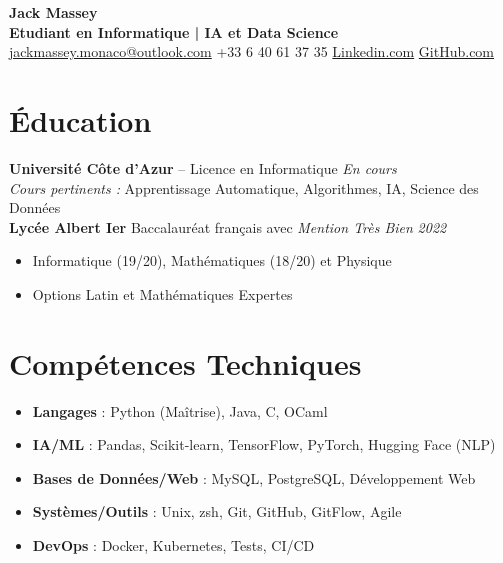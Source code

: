 \documentclass[a4paper,10pt]{article}
\begin{document}
\pagestyle{empty}

\begin{center}
    {\Huge \textbf{Jack Massey}}\\
    \vspace{2pt}
    \textbf{Etudiant en Informatique | IA et Data Science}\\
    \vspace{5pt}
    \faEnvelope \hspace{2pt} \href{mailto:jackmassey.monaco@outlook.com}{jackmassey.monaco@outlook.com} \quad
    \faPhone \hspace{2pt} +33 6 40 61 37 35 \quad
    \faLinkedin \hspace{2pt} \href{https://www.linkedin.com/in/masseyjack/}{Linkedin.com} \quad
    \faGithub \hspace{2pt} \href{https://github.com/TerminalGambit/}{GitHub.com}
\end{center}

\section*{Éducation}
\textbf{Université Côte d'Azur} -- Licence en Informatique \hfill \textit{En cours}\\
\textit{Cours pertinents :} Apprentissage Automatique, Algorithmes, IA, Science des Données\\
\textbf{Lycée Albert Ier} Baccalauréat français avec \textit{Mention Très Bien} \hfill \textit{2022}
\begin{itemize}
	\item Informatique (19/20), Mathématiques (18/20) et Physique
	\item Options Latin et Mathématiques Expertes
\end{itemize}

\section*{Compétences Techniques}
\begin{itemize}
    \item \textbf{Langages} : Python (Maîtrise), Java, C, OCaml
    \item \textbf{IA/ML} : Pandas, Scikit-learn, TensorFlow, PyTorch, Hugging Face (NLP)
    \item \textbf{Bases de Données/Web} : MySQL, PostgreSQL, Développement Web
    \item \textbf{Systèmes/Outils} : Unix, zsh, Git, GitHub, GitFlow, Agile
    \item \textbf{DevOps} : Docker, Kubernetes, Tests, CI/CD
\end{itemize}
\end{document}
